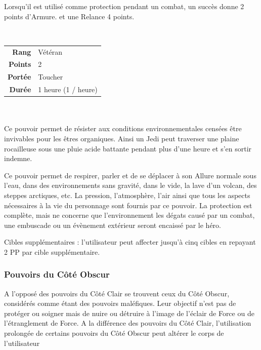 \begin{description}[align=left]
        Lorsqu'il est utilisé comme protection pendant un combat, un succès donne 2 points d’Armure. et une Relance 4 points.
        \\

    \item [Adaptation de Force] ~ \\

        \begin{tabular}{ r l }
            \textbf{Rang}    & Vétéran \\
            \textbf{Points}  & 2 \\
            \textbf{Portée}  & Toucher \\
            \textbf{Durée}   & 1 heure (1 / heure) \\
        \end{tabular}
        \\ \\
        Ce pouvoir permet de résister aux conditions environnementales censées être invivables pour les êtres organiques. Ainsi un Jedi peut traverser une plaine rocailleuse sous une pluie acide battante pendant plus d'une heure et s'en sortir indemne.

        Ce pouvoir permet de respirer, parler et de se déplacer à son Allure normale sous l’eau, dans des environnements sans gravité, dans le vide, la lave d’un volcan, des steppes arctiques, etc. La pression, l’atmosphère, l’air ainsi que tous les aspects nécessaires à la vie du personnage sont fournis par ce pouvoir. La protection est complète, mais ne concerne que l’environnement les dégats causé par un combat, une embuscade ou un évènement extérieur seront encaissé par le héro.

        Cibles supplémentaires : l’utilisateur peut affecter jusqu’à cinq cibles en repayant 2 PP par cible supplémentaire.
        \\

\end{description}

\subsubsection{Pouvoirs du Côté Obscur}

A l'opposé des pouvoirs du Côté Clair se trouvent ceux du Côté Obscur, considérés comme étant des pouvoirs maléfiques. Leur objectif n'est pas de protéger ou soigner mais de nuire ou détruire à l'image de l'éclair de Force ou de l'étranglement de Force. A la différence des pouvoirs du Côté Clair, l'utilisation prolongée de certains pouvoirs du Côté Obscur peut altérer le corps de l'utilisateur

